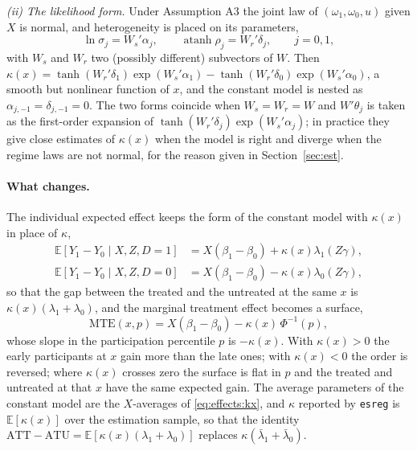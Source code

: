 \documentclass[11pt,a4paper]{article}
\theoremstyle{plain}
\theoremstyle{definition}
\theoremstyle{remark}
\newcommand{\E}{\mathbb{E}}
\newcommand{\ATT}{\mathrm{ATT}}
\newcommand{\ATU}{\mathrm{ATU}}
\newcommand{\MTE}{\mathrm{MTE}}
\newcommand{\1}{\mathbf{1}}
\newcommand{\cmd}[1]{\texttt{#1}}
\newcommand{\kX}{\kappa(x)}
\begin{document}
\emph{(ii) The likelihood form.} Under Assumption A3 the joint law of
$(\omega_1,\omega_0,u)$ given $X$ is normal, and heterogeneity is placed on
its parameters,
\begin{equation}\label{eq:fiml:kx}
\ln\sigma_j=W_s'\alpha_j,\qquad \operatorname{atanh}\rho_j=W_r'\delta_j,\qquad j=0,1,
\end{equation}
with $W_s$ and $W_r$ two (possibly different) subvectors of $W$. Then
$\kX=\tanh(W_r'\delta_1)\exp(W_s'\alpha_1)-\tanh(W_r'\delta_0)\exp(W_s'\alpha_0)$,
a smooth but nonlinear function of $x$, and the constant model is nested as
$\alpha_{j,-1}=\delta_{j,-1}=0$. The two forms coincide when $W_s=W_r=W$ and
$W'\theta_j$ is taken as the first-order expansion of
$\tanh(W_r'\delta_j)\exp(W_s'\alpha_j)$; in practice they give close
estimates of $\kX$ when the model is right and diverge when the regime laws
are not normal, for the reason given in Section~\ref{sec:est}.

\paragraph{What changes.}
The individual expected effect keeps the form of the constant model with
$\kX$ in place of $\kappa$,
\begin{equation}\label{eq:effects:kx}
\begin{aligned}
\E[Y_1-Y_0\mid X,Z,D=1]&=X(\beta_1-\beta_0)+\kX\lambda_1(Z\gamma),\\
\E[Y_1-Y_0\mid X,Z,D=0]&=X(\beta_1-\beta_0)-\kX\lambda_0(Z\gamma),
\end{aligned}
\end{equation}
so that the gap between the treated and the untreated at the same $x$ is
$\kX(\lambda_1+\lambda_0)$, and the marginal treatment effect becomes a
surface,
\begin{equation}\label{eq:mte:kx}
\MTE(x,p)=X(\beta_1-\beta_0)-\kX\,\Phi^{-1}(p),
\end{equation}
whose slope in the participation percentile $p$ is $-\kX$. With $\kX>0$ the
early participants at $x$ gain more than the late ones; with $\kX<0$ the
order is reversed; where $\kX$ crosses zero the surface is flat in $p$ and
the treated and untreated at that $x$ have the same expected gain. The
average parameters of the constant model are the $X$-averages of
\eqref{eq:effects:kx}, and $\kappa$ reported by \cmd{esreg} is $\E[\kX]$
over the estimation sample, so that the identity
$\ATT-\ATU=\E[\kX(\lambda_1+\lambda_0)]$ replaces
$\kappa(\bar\lambda_1+\bar\lambda_0)$.
\end{document}
